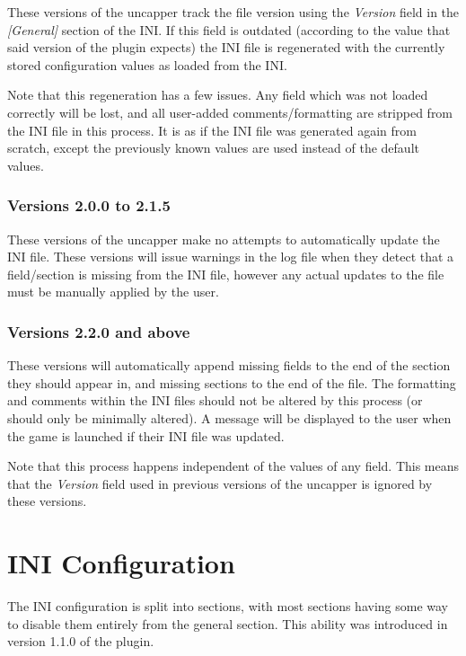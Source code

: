 \documentclass[12pt]{amsart}
\begin{document}
These versions of the uncapper track the file version using the \textit{Version}
field in the \textit{[General]} section of the INI. If this field is outdated
(according to the value that said version of the plugin expects) the INI file
is regenerated with the currently stored configuration values as loaded from
the INI.

Note that this regeneration has a few issues. Any field which was not loaded
correctly will be lost, and all user-added comments/formatting are stripped
from the INI file in this process. It is as if the INI file was generated again
from scratch, except the previously known values are used instead of the
default values.
\stopblock

\startblock
\subsubsection{Versions 2.0.0 to 2.1.5}

These versions of the uncapper make no attempts to automatically update the INI
file. These versions will issue warnings in the log file when they detect
that a field/section is missing from the INI file, however any actual updates
to the file must be manually applied by the user.
\stopblock

\startblock
\subsubsection{Versions 2.2.0 and above}

These versions will automatically append missing fields to the end of the
section they should appear in, and missing sections to the end of the file.
The formatting and comments within the INI files should not be altered by this
process (or should only be minimally altered). A message will be displayed to
the user when the game is launched if their INI file was updated.

Note that this process happens independent of the values of any field. This
means that the \textit{Version} field used in previous versions of the uncapper
is ignored by these versions.
\stopblock

\pagebreak
\section{INI Configuration}

The INI configuration is split into sections, with most sections having some
way to disable them entirely from the general section. This ability was
introduced in version 1.1.0 of the plugin.
\end{document}
